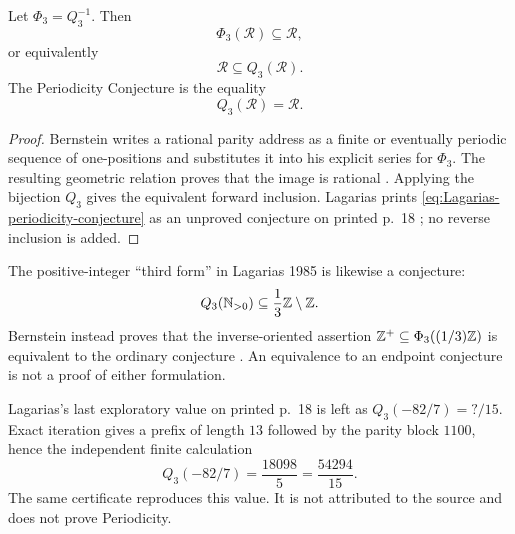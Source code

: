 \begin{proposition}
\label{prop:Bernstein-periodicity-half}
Let $\Phi_3=Q_3^{-1}$.  Then
\begin{equation}
\label{eq:Bernstein-rational-inclusion}
 \Phi_3(\mathcal R)\subseteq\mathcal R,
\end{equation}
or equivalently
\begin{equation}
\label{eq:Bernstein-rational-inclusion-forward}
 \mathcal R\subseteq Q_3(\mathcal R).
\end{equation}
The Periodicity Conjecture is the equality
\begin{equation}
\label{eq:Lagarias-periodicity-conjecture}
 Q_3(\mathcal R)=\mathcal R.
\end{equation}
\end{proposition}

\begin{proof}
Bernstein writes a rational parity address as a finite or eventually
periodic sequence of one-positions and substitutes it into his explicit
series for $\Phi_3$.  The resulting geometric relation proves that the image
is rational \cite[p.~407, Cor.~1]{Bernstein1994}.  Applying the bijection
$Q_3$ gives the equivalent forward inclusion.  Lagarias prints
\eqref{eq:Lagarias-periodicity-conjecture} as an unproved conjecture on
printed p.~18 \cite{Lagarias1985}; no reverse inclusion is added.
\end{proof}

The positive-integer ``third form'' in Lagarias 1985 is likewise a conjecture:
\begin{equation}
\label{eq:Lagarias-third-form}
 Q_3(\mathbb{N}_{>0})\subseteq\frac13\mathbb{Z}\setminus\mathbb{Z}.
\end{equation}
Bernstein instead proves that the inverse-oriented assertion
$\mathbb{Z}^+\subseteq\Phi_3((1/3)\mathbb{Z})$ is equivalent to the ordinary conjecture
\cite[pp.~406--407, Thms.~2--3]{Bernstein1994}.  An equivalence to an endpoint
conjecture is not a proof of either formulation.

Lagarias's last exploratory value on printed p.~18 is left as
$Q_3(-82/7)=?/15$.  Exact iteration gives a prefix of length $13$ followed by
the parity block $1100$, hence the independent finite calculation
\begin{equation}
\label{calc:Lagarias1985-minus82}
 Q_3(-82/7)=\frac{18098}{5}=\frac{54294}{15}.
\end{equation}
The same certificate reproduces this value.  It is not attributed to the
source and does not prove Periodicity.

